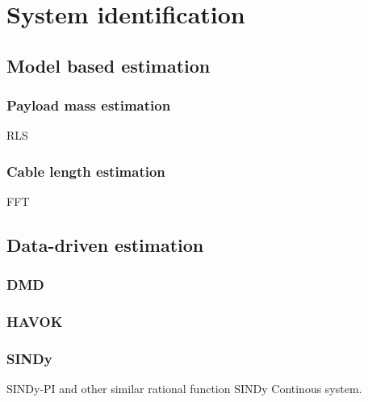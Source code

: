 \graphicspath{{system_id/fig/}}

\chapter{System identification}
\label{chap:system_id}



\section{Model based estimation}

\subsection{Payload mass estimation}
RLS

\subsection{Cable length estimation}
FFT

\section{Data-driven estimation}
\subsection{DMD}
\subsection{HAVOK}
\subsection{SINDy}
SINDy-PI and other similar rational function SINDy
Continous system.

